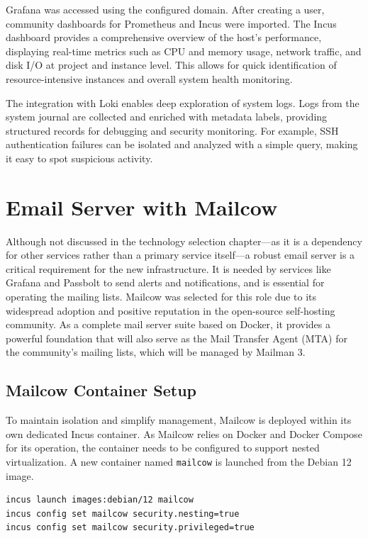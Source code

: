 Grafana was accessed using the configured domain. After creating a user, community dashboards for Prometheus and Incus were imported. The Incus dashboard provides a comprehensive overview of the host's performance, displaying real-time metrics such as CPU and memory usage, network traffic, and disk I/O at project and instance level. This allows for quick identification of resource-intensive instances and overall system health monitoring.

The integration with Loki enables deep exploration of system logs. Logs from the system journal are collected and enriched with metadata labels, providing structured records for debugging and security monitoring. For example, SSH authentication failures can be isolated and analyzed with a simple query, making it easy to spot suspicious activity.


\section{Email Server with Mailcow}

Although not discussed in the technology selection chapter---as it is a dependency for other services rather than a primary service itself---a robust email server is a critical requirement for the new infrastructure. It is needed by services like Grafana and Passbolt to send alerts and notifications, and is essential for operating the mailing lists. Mailcow was selected for this role due to its widespread adoption and positive reputation in the open-source self-hosting community. As a complete mail server suite based on Docker, it provides a powerful foundation that will also serve as the Mail Transfer Agent (MTA) for the community's mailing lists, which will be managed by Mailman 3.

\subsection*{Mailcow Container Setup}

To maintain isolation and simplify management, Mailcow is deployed within its own dedicated Incus container. As Mailcow relies on Docker and Docker Compose for its operation, the container needs to be configured to support nested virtualization\cite{incus-faq-docker-nesting}. A new container named \texttt{mailcow} is launched from the Debian 12 image.

\begin{lstlisting}[language=bash,caption={Commands to create and configure the Mailcow container}]
incus launch images:debian/12 mailcow
incus config set mailcow security.nesting=true
incus config set mailcow security.privileged=true
\end{lstlisting}


